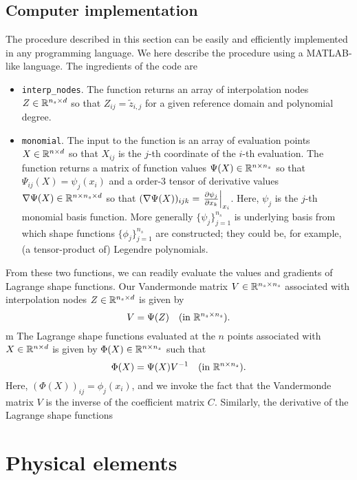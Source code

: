 \subsection{Computer implementation}
The procedure described in this section can be easily and efficiently implemented in any programming language. We here describe the procedure using a MATLAB-like language. The ingredients of the code are
\begin{itemize}
\item \texttt{interp\_nodes}.  The function returns an array of interpolation nodes $Z \in \mathbb{R}^{n_s \times d}$ so that $Z_{ij} = \tilde z_{i,j}$ for a given reference domain and polynomial degree.
\item \texttt{monomial}. The input to the function is an array of evaluation points $X \in \mathbb{R}^{n \times d}$ so that $X_{ij}$ is the $j$-th coordinate of the $i$-th evaluation. The function returns a matrix of function values $\Psi(X) \in \mathbb{R}^{n \times n_s}$ so that $\Psi_{ij}(X) = \psi_j(x_i)$ and a order-3 tensor of derivative values $\nabla\Psi(X) \in \mathbb{R}^{n \times n_s \times d}$ so that $(\nabla \Psi(X))_{ijk} = \left. \frac{\partial \psi_j}{\partial x_k} \right|_{x_i}$.  Here, $\psi_j$ is the $j$-th monomial basis function.  More generally $\{ \psi_j \}_{j=1}^{n_s}$ is underlying basis from which shape functions $\{ \phi_j \}_{j=1}^{n_s}$ are constructed; they could be, for example, (a tensor-product of) Legendre polynomials.
\end{itemize}
From these two functions, we can readily evaluate the values and gradients of Lagrange shape functions.  Our Vandermonde matrix $V \in \mathbb{R}^{n_s \times n_s}$ associated with interpolation nodes $Z \in \mathbb{R}^{n_s \times d}$ is given by
\begin{equation*}
  V = \Psi(Z) \quad (\text{in } \mathbb{R}^{n_s \times n_s}).
\end{equation*}m
The Lagrange shape functions evaluated at the $n$ points associated with $X \in \mathbb{R}^{n \times d}$ is given by $\Phi(X) \in \mathbb{R}^{n \times n_s}$ such that
\begin{equation*}
  \Phi(X) = \Psi(X) V^{-1} \quad (\text{in } \mathbb{R}^{n \times n_s}).
\end{equation*}
Here, $(\Phi(X))_{ij} = \phi_j(x_i)$, and we invoke the fact that the Vandermonde matrix $V$ is the inverse of the coefficient matrix $C$. Similarly, the derivative of the Lagrange shape functions 

  \section{Physical elements}
  \label{sec:fe_phy_elem}
